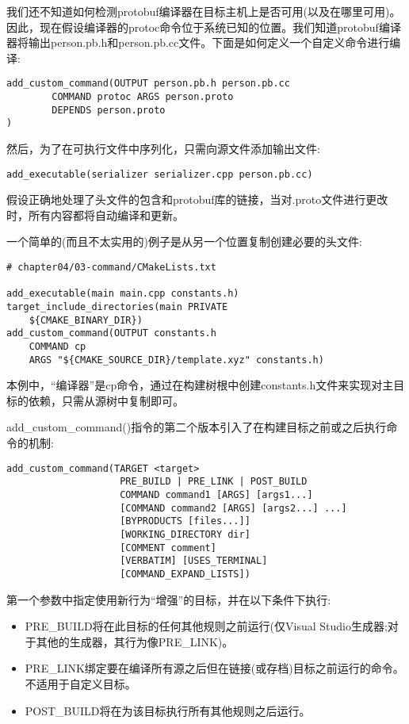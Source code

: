 我们还不知道如何检测protobuf编译器在目标主机上是否可用(以及在哪里可用)。因此，现在假设编译器的protoc命令位于系统已知的位置。我们知道protobuf编译器将输出person.pb.h和person.pb.cc文件。下面是如何定义一个自定义命令进行编译:

\begin{lstlisting}[style=styleCMake]
add_custom_command(OUTPUT person.pb.h person.pb.cc
		COMMAND protoc ARGS person.proto
		DEPENDS person.proto
)
\end{lstlisting}

然后，为了在可执行文件中序列化，只需向源文件添加输出文件:

\begin{lstlisting}[style=styleCMake]
add_executable(serializer serializer.cpp person.pb.cc)
\end{lstlisting}

假设正确地处理了头文件的包含和protobuf库的链接，当对.proto文件进行更改时，所有内容都将自动编译和更新。

一个简单的(而且不太实用的)例子是从另一个位置复制创建必要的头文件:

\begin{lstlisting}[style=styleCMake]
# chapter04/03-command/CMakeLists.txt

add_executable(main main.cpp constants.h)
target_include_directories(main PRIVATE
	${CMAKE_BINARY_DIR})
add_custom_command(OUTPUT constants.h
	COMMAND cp
	ARGS "${CMAKE_SOURCE_DIR}/template.xyz" constants.h)
\end{lstlisting}

本例中，“编译器”是cp命令，通过在构建树根中创建constants.h文件来实现对主目标的依赖，只需从源树中复制即可。


add\_custom\_command()指令的第二个版本引入了在构建目标之前或之后执行命令的机制:

\begin{lstlisting}[style=styleCMake]
add_custom_command(TARGET <target>
					PRE_BUILD | PRE_LINK | POST_BUILD
					COMMAND command1 [ARGS] [args1...]
					[COMMAND command2 [ARGS] [args2...] ...]
					[BYPRODUCTS [files...]]
					[WORKING_DIRECTORY dir]
					[COMMENT comment]
					[VERBATIM] [USES_TERMINAL]
					[COMMAND_EXPAND_LISTS])
\end{lstlisting}

第一个参数中指定使用新行为“增强”的目标，并在以下条件下执行:

\begin{itemize}
\item 
PRE\_BUILD将在此目标的任何其他规则之前运行(仅Visual Studio生成器;对于其他的生成器，其行为像PRE\_LINK)。

\item 
PRE\_LINK绑定要在编译所有源之后但在链接(或存档)目标之前运行的命令。不适用于自定义目标。

\item 
POST\_BUILD将在为该目标执行所有其他规则之后运行。
\end{itemize}

